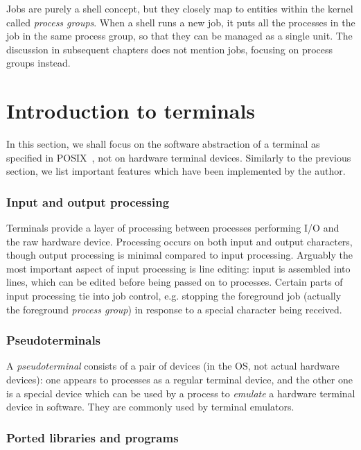 \documentclass[shortabstract, manyadvisors, english, mgr]{iithesis}
\begin{document}
Jobs are purely a shell concept, but they closely map to entities within the
kernel called \textit{process groups}. When a shell runs a new job, it puts all
the processes in the job in the same process group, so that they can be managed
as a single unit. The discussion in subsequent chapters does not mention jobs,
focusing on process groups instead.

\section{Introduction to terminals}

In this section, we shall focus on the software abstraction of a terminal as
specified in POSIX~\cite{terminal-spec}, not on hardware terminal devices.
Similarly to the previous section, we list important features which have been
implemented by the author.

\subsubsection*{Input and output processing}

Terminals provide a layer of processing between processes performing I/O and the
raw hardware device. Processing occurs on both input and output characters,
though output processing is minimal compared to input processing. Arguably the
most important aspect of input processing is line editing: input is assembled
into lines, which can be edited before being passed on to processes. Certain
parts of input processing tie into job control, e.g. stopping the foreground job
(actually the foreground \textit{process group}) in response to a special
character being received.

\subsubsection*{Pseudoterminals}

A \textit{pseudoterminal} consists of a pair of devices (in the OS, not actual
hardware devices): one appears to processes as a regular terminal device, and
the other one is a special device which can be used by a process to
\textit{emulate} a hardware terminal device in software. They are commonly used
by terminal emulators.

\subsubsection*{Ported libraries and programs}
\end{document}
